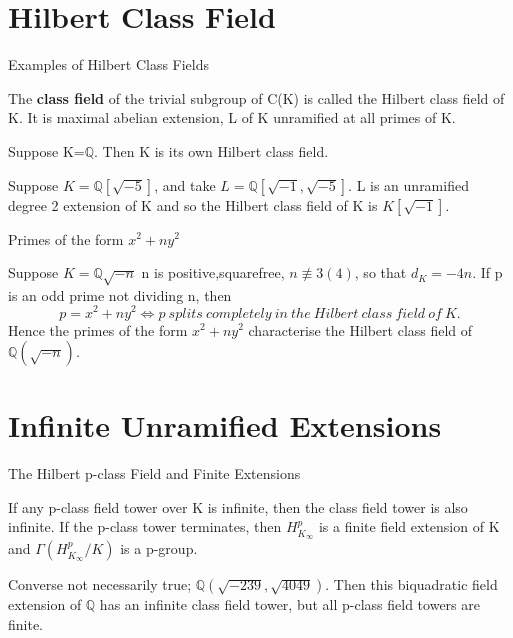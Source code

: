 \documentclass[10pt]{beamer}
\begin{document}
\section{Hilbert Class Field}
\begin{frame}{Examples of Hilbert Class Fields}
  \begin{definition}
The \textbf{class field} of the trivial subgroup of C(K) is called the Hilbert class field of K. It is maximal abelian extension, L of K unramified at all primes of K.
\end{definition}
    \begin{example}
    Suppose K=$\mathbb{Q}$. Then K is its own Hilbert class field. 
\end{example}
\begin{example}
    Suppose $K=\mathbb{Q}[\sqrt{-5}]$, and take $L=\mathbb{Q}[\sqrt{-1},\sqrt{-5}]$. L is an unramified degree 2 extension of K and so the Hilbert class field of K is $K[\sqrt{-1}]$.
\end{example}

\end{frame}
\begin{frame}{Primes of the form $x^2+ny^2$}
    \begin{corollary}
Suppose $K=\mathbb{Q}{\sqrt{-n}}$ n is positive,squarefree, $n\not\equiv 3(4)$, so that $d_K=-4n$. If p is an odd prime not dividing n, then
\begin{equation} p=x^2+ny^2 \Longleftrightarrow p\:splits\:completely\:in\:the\:Hilbert\:class\:field\:of\:K.
\end{equation}
Hence the primes of the form $x^2+ny^2$ characterise the Hilbert class field of $\mathbb{Q}(\sqrt{-n})$.
\end{corollary}
\end{frame}

\section{Infinite Unramified Extensions}

\begin{frame}{The Hilbert p-class Field and Finite Extensions}
    \begin{Theorem}
If any p-class field tower over K is infinite, then the class field tower is also infinite. If the p-class tower terminates, then $H_{K_\infty}^{p}$ is a finite field extension of K and $\Gamma(H_{K_\infty}^{p}/K)$ is a p-group.
\end{Theorem}
Converse not necessarily true; $\mathbb{Q}(\sqrt{-239},\sqrt{4049})$. Then this biquadratic field extension of $\mathbb{Q}$ has an infinite class field tower, but all p-class field towers are finite. 
\end{frame}
\end{document}
